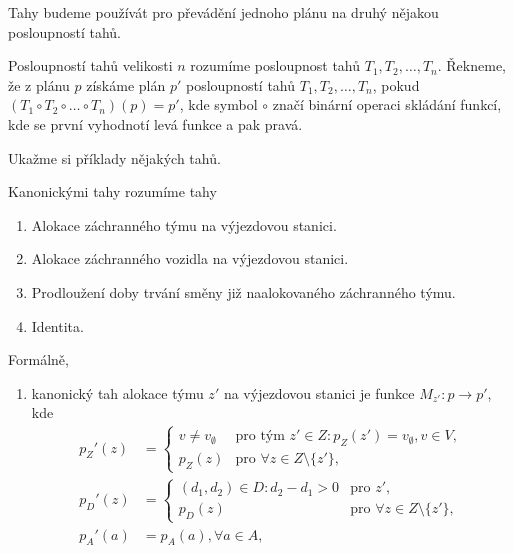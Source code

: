 Tahy budeme používát pro převádění jednoho plánu na druhý nějakou posloupností tahů.

\begin{definice}
  Posloupností tahů velikosti $n$ rozumíme posloupnost tahů $T_1, T_2, \dots, T_n$.
  Řekneme, že z plánu $p$ získáme plán $p'$ posloupností tahů $T_1, T_2, \dots, T_n$,
  pokud $(T_1 \circ T_2 \circ \dots \circ T_n)(p) = p'$, kde symbol $\circ$ značí binární operaci skládání funkcí,
  kde se první vyhodnotí levá funkce a pak pravá.
\end{definice}

Ukažme si příklady nějakých tahů.

\begin{definice}
  Kanonickými tahy rozumíme tahy
  \begin{enumerate}
    \item
      Alokace záchranného týmu na výjezdovou stanici.

    \item
      Alokace záchranného vozidla na výjezdovou stanici.

    \item
      Prodloužení doby trvání směny již naalokovaného záchranného týmu. 

    \item
      Identita.
  \end{enumerate}

  Formálně,
  \begin{enumerate}
    \item
      kanonický tah alokace týmu $z'$ na výjezdovou stanici je funkce $M_{z'} : p \rightarrow p'$, kde
      \begin{align*}
        p_Z'(z) &=
          \begin{cases}
            v \neq v_{\emptyset} & \text{pro tým $z' \in Z \colon p_Z(z') = v_{\emptyset}, v \in V$}, \\
            p_Z(z) & \text{pro $\forall z \in Z \setminus \{ z' \}$},
          \end{cases}
          \\
        p_D'(z) &=
          \begin{cases}
            (d_1, d_2) \in D \colon d_2 - d_1 > 0 & \text{pro $z'$}, \\
            p_D(z) & \text{pro $\forall z \in Z \setminus \{ z' \}$},
          \end{cases}
          \\
        p_A'(a) &= p_A(a), \forall a \in A,
      \end{align*}


\end{enumerate}
\end{definice}
